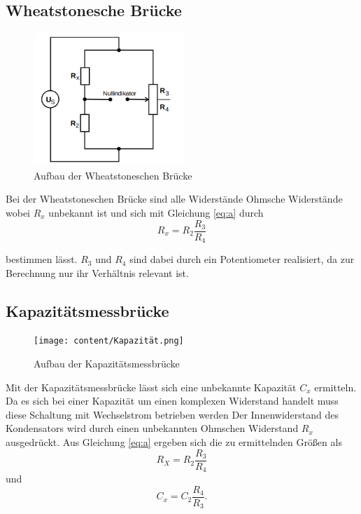 \subsection{Wheatstonesche Brücke}
\begin{figure}[H]
\centering
    \includegraphics[height= 5cm]{content/Wheatstone.png}
    \caption{Aufbau der Wheatstoneschen Brücke\cite[219]{sample}}
\end{figure}
\noindent Bei der Wheatstoneschen Brücke sind alle
Widerstände Ohmsche Widerstände wobei $R_x$ unbekannt
ist und sich mit Gleichung \ref{eq:a} durch
\begin{equation}
    R_x=R_2\frac{R_3}{R_4}
    \label{eq:1}
\end{equation}

\noindent bestimmen lässt. $R_3$ und $R_4$ sind dabei
durch ein Potentiometer realisiert, da zur Berechnung
nur ihr Verhältnis relevant ist.


\subsection{Kapazitätsmessbrücke}
\label{sec:Kap}
\begin{figure}[H]
\centering
    \texttt{[image: content/Kapazität.png]}
    \caption{Aufbau der Kapazitätsmessbrücke\cite[220]{sample}}
\end{figure}
\noindent Mit der Kapazitätsmessbrücke lässt sich eine
unbekannte Kapazität $C_x$ ermitteln. Da es sich
bei einer Kapazität um einen komplexen Widerstand handelt
muss diese Schaltung mit Wechselstrom betrieben werden
Der Innenwiderstand des Kondensators wird durch einen
unbekannten Ohmschen Widerstand $R_x$ ausgedrückt.
Aus Gleichung \ref{eq:a} ergeben sich die zu ermittelnden
Größen als
\begin{equation}
    R_X=R_2\frac{R_3}{R_4}
    \label{eq:3}
\end{equation}
\noindent und
\begin{equation}
    C_x=C_2\frac{R_4}{R_3}.
    \label{eq:4}
\end{equation}




